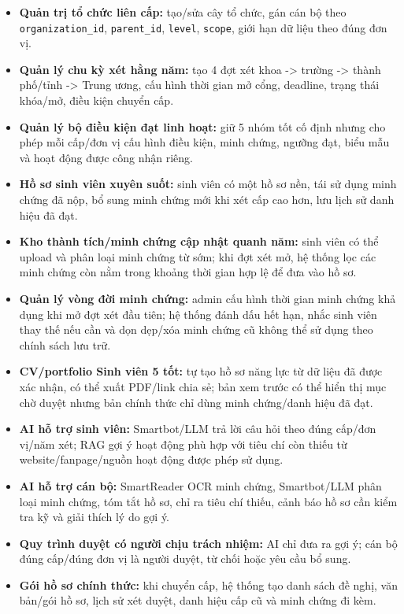 \begin{itemize}
    \item \textbf{Quản trị tổ chức liên cấp:} tạo/sửa cây tổ chức, gán cán bộ theo \texttt{organization\_id}, \texttt{parent\_id}, \texttt{level}, \texttt{scope}, giới hạn dữ liệu theo đúng đơn vị.
    \item \textbf{Quản lý chu kỳ xét hằng năm:} tạo 4 đợt xét khoa -{}> trường -{}> thành phố/tỉnh -{}> Trung ương, cấu hình thời gian mở cổng, deadline, trạng thái khóa/mở, điều kiện chuyển cấp.
    \item \textbf{Quản lý bộ điều kiện đạt linh hoạt:} giữ 5 nhóm tốt cố định nhưng cho phép mỗi cấp/đơn vị cấu hình điều kiện, minh chứng, ngưỡng đạt, biểu mẫu và hoạt động được công nhận riêng.
    \item \textbf{Hồ sơ sinh viên xuyên suốt:} sinh viên có một hồ sơ nền, tái sử dụng minh chứng đã nộp, bổ sung minh chứng mới khi xét cấp cao hơn, lưu lịch sử danh hiệu đã đạt.
    \item \textbf{Kho thành tích/minh chứng cập nhật quanh năm:} sinh viên có thể upload và phân loại minh chứng từ sớm; khi đợt xét mở, hệ thống lọc các minh chứng còn nằm trong khoảng thời gian hợp lệ để đưa vào hồ sơ.
    \item \textbf{Quản lý vòng đời minh chứng:} admin cấu hình thời gian minh chứng khả dụng khi mở đợt xét đầu tiên; hệ thống đánh dấu hết hạn, nhắc sinh viên thay thế nếu cần và dọn dẹp/xóa minh chứng cũ không thể sử dụng theo chính sách lưu trữ.
    \item \textbf{CV/portfolio Sinh viên 5 tốt:} tự tạo hồ sơ năng lực từ dữ liệu đã được xác nhận, có thể xuất PDF/link chia sẻ; bản xem trước có thể hiển thị mục chờ duyệt nhưng bản chính thức chỉ dùng minh chứng/danh hiệu đã đạt.
    \item \textbf{AI hỗ trợ sinh viên:} Smartbot/LLM trả lời câu hỏi theo đúng cấp/đơn vị/năm xét; RAG gợi ý hoạt động phù hợp với tiêu chí còn thiếu từ website/fanpage/nguồn hoạt động được phép sử dụng.
    \item \textbf{AI hỗ trợ cán bộ:} SmartReader OCR minh chứng, Smartbot/LLM phân loại minh chứng, tóm tắt hồ sơ, chỉ ra tiêu chí thiếu, cảnh báo hồ sơ cần kiểm tra kỹ và giải thích lý do gợi ý.
    \item \textbf{Quy trình duyệt có người chịu trách nhiệm:} AI chỉ đưa ra gợi ý; cán bộ đúng cấp/đúng đơn vị là người duyệt, từ chối hoặc yêu cầu bổ sung.
    \item \textbf{Gói hồ sơ chính thức:} khi chuyển cấp, hệ thống tạo danh sách đề nghị, văn bản/gói hồ sơ, lịch sử xét duyệt, danh hiệu cấp cũ và minh chứng đi kèm.

\end{itemize}
